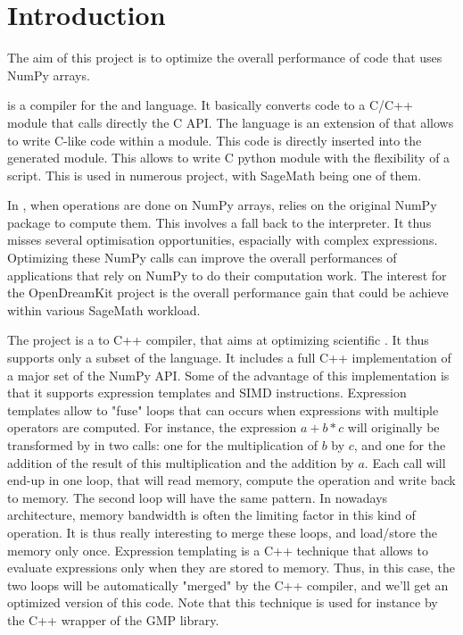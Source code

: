 \documentclass{deliverablereport}
\author{Adrien Guinet et Clément Pernet}
\begin{document}
\maketitle
\strut\githubissuedescription
\tableofcontents\newpage

\section{Introduction}

The aim of this project is to optimize the overall performance of \Cython code
that uses NumPy arrays.

\Cython is a compiler for the \Python and \Cython language. It basically converts
\Python code to a C/C++ module that calls directly the C \Python API. The \Cython
language is an extension of \Python that allows to write C-like code within a
\Python module. This code is directly inserted into the generated module. This
allows to write C python module with the flexibility of a \Python script. This
is used in numerous \Python project, with SageMath being one of them.

In \Cython, when operations are done on NumPy arrays, \Cython relies on the
original NumPy package to compute them. This involves a fall back to the \Python
interpreter. It thus misses several optimisation opportunities, espacially with
complex expressions. Optimizing these NumPy calls can improve the overall
performances of applications that rely on NumPy to do their computation work.
The interest for the OpenDreamKit project is the overall performance gain that
could be achieve within various SageMath workload.

The \Pythran project is a \Python to C++ compiler, that aims at optimizing
scientific \Python. It thus supports only a subset of the \Python language.
It includes a full C++ implementation of a major set of the NumPy API. Some of
the advantage of this implementation is that it supports expression templates
and SIMD instructions. Expression templates allow to "fuse" loops that can
occurs when expressions with multiple operators are computed. For instance,
the expression $a+b*c$ will originally be transformed by \Cython in two calls: one
for the multiplication of $b$ by $c$, and one for the addition of the result of
this multiplication and the addition by $a$. Each call will end-up in one loop,
that will read memory, compute the operation and write back to memory. The
second loop will have the same pattern. In nowadays architecture, memory
bandwidth is often the limiting factor in this kind of operation. It is thus
really interesting to merge these loops, and load/store the memory only once.
Expression templating is a C++ technique that allows to evaluate expressions
only when they are stored to memory. Thus, in this case, the two loops will be
automatically "merged" by the C++ compiler, and we'll get an optimized version
of this code. Note that this technique is used for instance by the C++ wrapper
of the GMP library.
\end{document}
